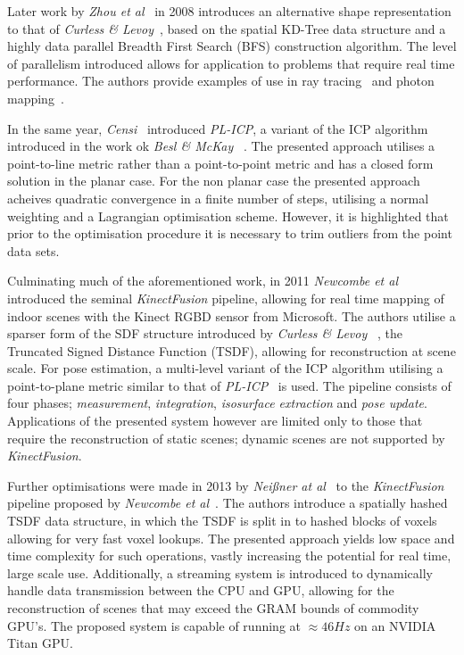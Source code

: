 Later work by \textit{Zhou et al}~\cite{Zhou2008} in 2008 introduces an alternative 
shape representation to that of \textit{Curless \& Levoy}~\cite{Curless1996}, based 
on the spatial KD-Tree data structure and a highly data parallel Breadth First 
Search (BFS) construction algorithm. The level of parallelism introduced allows for 
application to problems that require real time performance. The authors provide 
examples of use in ray tracing~\cite{Purcell2002} and photon mapping~\cite{Kajiya1986}.

In the same year, \textit{Censi}~\cite{Censi2008} introduced \textit{PL-ICP}, a 
variant of the ICP algorithm introduced in the work ok \textit{Besl \& McKay} 
~\cite{Besl1992}. The presented approach utilises a point-to-line metric rather than 
a point-to-point metric and has a closed form solution in the planar case. For the non 
planar case the presented approach acheives quadratic convergence in a finite number of 
steps, utilising a normal weighting and a Lagrangian optimisation scheme. However, it is 
highlighted that prior to the optimisation procedure it is necessary to trim outliers 
from the point data sets.

Culminating much of the aforementioned work, in 2011 \textit{Newcombe et al} 
~\cite{Newcombe2011} introduced the seminal \textit{KinectFusion} pipeline, allowing 
for real time mapping of indoor scenes with the Kinect RGBD sensor from Microsoft. The 
authors utilise a sparser form of the SDF structure introduced by \textit{Curless \& Levoy} 
~\cite{Curless1996}, the Truncated Signed Distance Function (TSDF), allowing for reconstruction 
at scene scale. For pose estimation, a multi-level variant of the ICP algorithm utilising a 
point-to-plane metric similar to that of \textit{PL-ICP}~\cite{Censi2008} is used. The pipeline 
consists of four phases; \textit{measurement}, \textit{integration}, \textit{isosurface extraction} 
and \textit{pose update}. Applications of the presented system however are limited only to 
those that require the reconstruction of static scenes; dynamic scenes are not supported 
by \textit{KinectFusion}.

Further optimisations were made in 2013 by \textit{Nei{\ss}ner at al}~\cite{NieBner2013} to the 
\textit{KinectFusion} pipeline proposed by \textit{Newcombe et al}~\cite{Newcombe2011}. The authors 
introduce a spatially hashed TSDF data structure, in which the TSDF is split in to hashed blocks of 
voxels allowing for very fast voxel lookups. The presented approach yields low space and time complexity 
for such operations, vastly increasing the potential for real time, large scale use. Additionally, 
a streaming system is introduced to dynamically handle data transmission between the CPU and GPU, 
allowing for the reconstruction of scenes that may exceed the GRAM bounds of commodity GPU's. The 
proposed system is capable of running at \(\approx46Hz\) on an NVIDIA Titan GPU.\@

